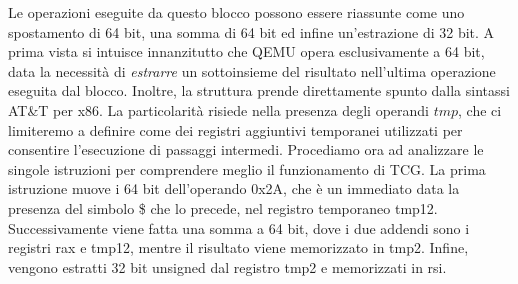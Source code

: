 \documentclass[Lau, oneside]{sapthesis}%
\begin{document}
Le operazioni eseguite da questo blocco possono essere riassunte come uno spostamento di 64 bit, una somma di 64 bit ed infine un'estrazione di 32 bit.
\newline \newline
A prima vista si intuisce innanzitutto che QEMU opera esclusivamente a 64 bit, data la necessità di \textit{estrarre} un sottoinsieme del risultato nell'ultima operazione eseguita dal blocco.
\newline
Inoltre, la struttura prende direttamente spunto dalla sintassi AT\&T per x86.
\newline
La particolarità risiede nella presenza degli operandi $tmp$, che ci limiteremo a definire come dei registri aggiuntivi temporanei utilizzati per consentire l'esecuzione di passaggi intermedi.
\newline \newline \newline
Procediamo ora ad analizzare le singole istruzioni per comprendere meglio il funzionamento di TCG.
\newline \newline
La prima istruzione muove i 64 bit dell'operando 0x2A, che è un immediato data la presenza del simbolo \$ che lo precede, nel registro temporaneo tmp12.
\newline
Successivamente viene fatta una somma a 64 bit, dove i due addendi sono i registri rax e tmp12, mentre il risultato viene memorizzato in tmp2.
\newline
Infine, vengono estratti 32 bit unsigned dal registro tmp2 e memorizzati in rsi.
\end{document}
